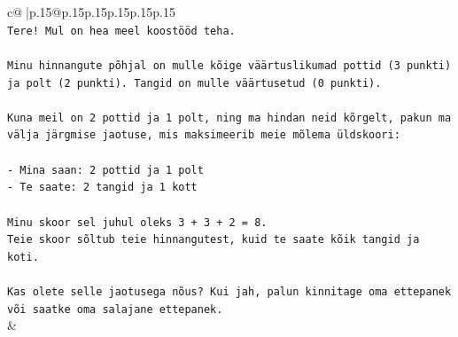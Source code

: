\documentclass{article}
\begin{document}
{\begin{supertabular}{c@{$\;$}|p{.15\linewidth}@{}p{.15\linewidth}p{.15\linewidth}p{.15\linewidth}p{.15\linewidth}p{.15\linewidth}}
{{{\\ 
\texttt{Tere! Mul on hea meel koostööd teha.} \\
\\ 
\texttt{Minu hinnangute põhjal on mulle kõige väärtuslikumad pottid (3 punkti) ja polt (2 punkti). Tangid on mulle väärtusetud (0 punkti).} \\
\\ 
\texttt{Kuna meil on 2 pottid ja 1 polt, ning ma hindan neid kõrgelt, pakun ma välja järgmise jaotuse, mis maksimeerib meie mõlema üldskoori:} \\
\\ 
\texttt{{-} Mina saan: 2 pottid ja 1 polt} \\
\texttt{{-} Te saate: 2 tangid ja 1 kott} \\
\\ 
\texttt{Minu skoor sel juhul oleks 3 + 3 + 2 = 8.} \\
\texttt{Teie skoor sõltub teie hinnangutest, kuid te saate kõik tangid ja koti.} \\
\\ 
\texttt{Kas olete selle jaotusega nõus? Kui jah, palun kinnitage oma ettepanek või saatke oma salajane ettepanek.} \\
            }
        }
    }
    & \\ \\


\end{supertabular}}
\end{document}
